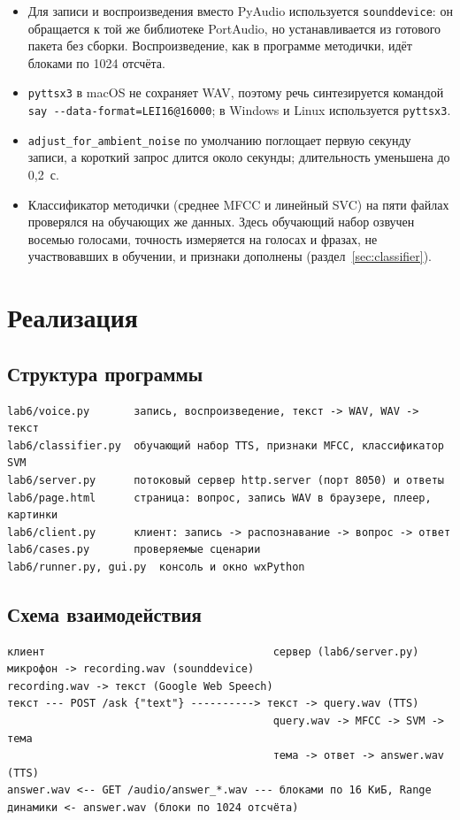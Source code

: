 \documentclass[14pt,a4paper]{extarticle}
\begin{document}
\begin{itemize}
\item Для записи и воспроизведения вместо PyAudio используется \texttt{sounddevice}: он
обращается к той же библиотеке PortAudio, но устанавливается из готового пакета без
сборки. Воспроизведение, как в программе методички, идёт блоками по 1024 отсчёта.
\item \texttt{pyttsx3} в macOS не сохраняет WAV, поэтому речь синтезируется командой
\texttt{say -{}-data-format=LEI16@16000}; в Windows и Linux используется
\texttt{pyttsx3}.
\item \texttt{adjust\_for\_ambient\_noise} по умолчанию поглощает первую секунду записи,
а короткий запрос длится около секунды; длительность уменьшена до 0,2~с.
\item Классификатор методички (среднее MFCC и линейный SVC) на пяти файлах проверялся
на обучающих же данных. Здесь обучающий набор озвучен восемью голосами, точность
измеряется на голосах и фразах, не участвовавших в обучении, и признаки дополнены
(раздел~\ref{sec:classifier}).
\end{itemize}

\section{Реализация}

\subsection{Структура программы}

\begin{Verbatim}[fontsize=\scriptsize, frame=single, samepage=true]
lab6/voice.py       запись, воспроизведение, текст -> WAV, WAV -> текст
lab6/classifier.py  обучающий набор TTS, признаки MFCC, классификатор SVM
lab6/server.py      потоковый сервер http.server (порт 8050) и ответы
lab6/page.html      страница: вопрос, запись WAV в браузере, плеер, картинки
lab6/client.py      клиент: запись -> распознавание -> вопрос -> ответ
lab6/cases.py       проверяемые сценарии
lab6/runner.py, gui.py  консоль и окно wxPython
\end{Verbatim}

\subsection{Схема взаимодействия}

\begin{Verbatim}[fontsize=\scriptsize, frame=single, samepage=true]
клиент                                    сервер (lab6/server.py)
микрофон -> recording.wav (sounddevice)
recording.wav -> текст (Google Web Speech)
текст --- POST /ask {"text"} ----------> текст -> query.wav (TTS)
                                          query.wav -> MFCC -> SVM -> тема
                                          тема -> ответ -> answer.wav (TTS)
answer.wav <-- GET /audio/answer_*.wav --- блоками по 16 КиБ, Range
динамики <- answer.wav (блоки по 1024 отсчёта)
\end{Verbatim}
\end{document}
